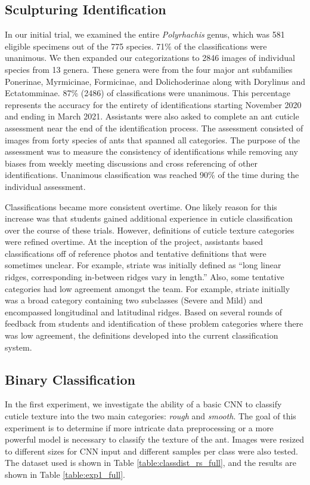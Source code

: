 \documentclass{aci}
\begin{document}
\subsection{Sculpturing Identification}
In our initial trial, we examined the entire \textit{Polyrhachis} genus, which
was 581 eligible specimens out of the 775 species. 71\% of the classifications
were unanimous. We then expanded our categorizations to 2846 images of
individual species from 13 genera. These genera were from the four major ant
subfamilies Ponerinae, Myrmicinae, Formicinae, and Dolichoderinae along with
Dorylinus and Ectatomminae. 87\% (2486) of classifications were unanimous. This
percentage represents the accuracy for the entirety of identifications starting
November 2020 and ending in March 2021. Assistants were also asked to complete
an ant cuticle assessment near the end of the identification process. The
assessment consisted of images from forty species of ants that spanned all
categories. The purpose of the assessment was to measure the consistency of
identifications while removing any biases from weekly meeting discussions and
cross referencing of other identifications. Unanimous classification was reached
90\% of the time during the individual assessment.

Classifications became more consistent overtime. One likely reason for this
increase was that students gained additional experience in cuticle
classification over the course of these trials. However, definitions of cuticle
texture categories were refined overtime. At the inception of the project,
assistants based classifications off of reference photos and tentative
definitions that were sometimes unclear. For example, striate was initially
defined as “long linear ridges, corresponding in-between ridges vary in length.”
Also, some tentative categories had low agreement amongst the team. For example,
striate initially was a broad category containing two subclasses (Severe and
Mild) and encompassed longitudinal and latitudinal ridges. Based on several
rounds of feedback from students and identification of these problem categories
where there was low agreement, the definitions developed into the current
classification system.

\subsection{Binary Classification}

In the first experiment, we investigate the ability of a basic CNN to classify
cuticle texture into the two main categories: \textit{rough} and
\textit{smooth}. The goal of this experiment is to determine if more intricate
data preprocessing or a more powerful model is necessary to classify the texture
of the ant. Images were resized to different sizes for CNN input and different
samples per class were also tested. The dataset used is shown in Table
\ref{table:classdist_rs_full}, and the results are shown in Table
\ref{table:exp1_full}.
\end{document}
